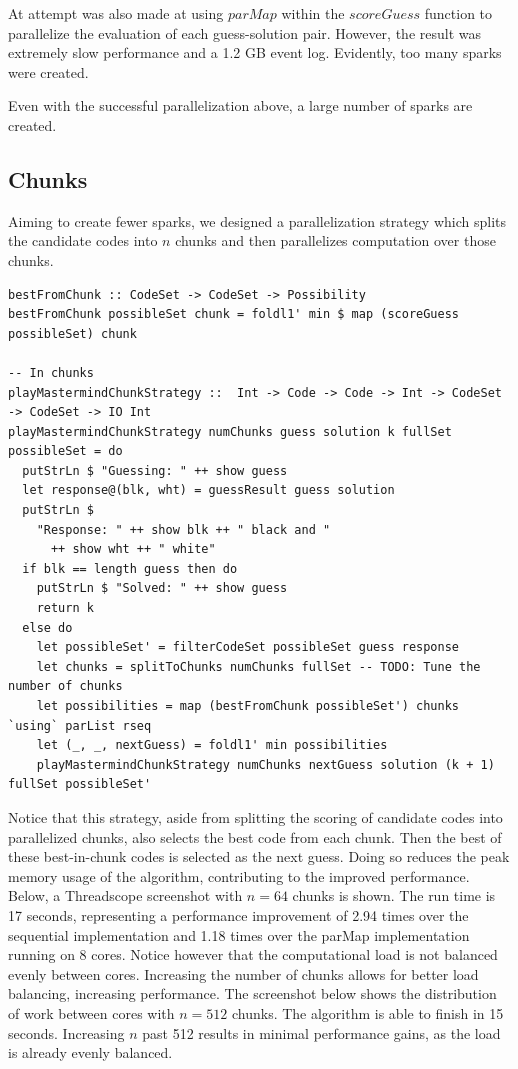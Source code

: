 \documentclass{article}
\begin{document}
At attempt was also made at using $parMap$ within the $scoreGuess$ function to parallelize the evaluation of each guess-solution pair. However, the result was extremely slow performance and a 1.2 GB event log. Evidently, too many sparks were created.

Even with the successful parallelization above, a large number of sparks are created.

\subsection{Chunks}
Aiming to create fewer sparks, we designed a parallelization strategy which splits the candidate codes into $n$ chunks and then parallelizes computation over those chunks.
\begin{verbatim}
bestFromChunk :: CodeSet -> CodeSet -> Possibility
bestFromChunk possibleSet chunk = foldl1' min $ map (scoreGuess possibleSet) chunk

-- In chunks
playMastermindChunkStrategy ::  Int -> Code -> Code -> Int -> CodeSet -> CodeSet -> IO Int
playMastermindChunkStrategy numChunks guess solution k fullSet possibleSet = do
  putStrLn $ "Guessing: " ++ show guess
  let response@(blk, wht) = guessResult guess solution
  putStrLn $
    "Response: " ++ show blk ++ " black and "
      ++ show wht ++ " white"
  if blk == length guess then do
    putStrLn $ "Solved: " ++ show guess
    return k
  else do
    let possibleSet' = filterCodeSet possibleSet guess response
    let chunks = splitToChunks numChunks fullSet -- TODO: Tune the number of chunks
    let possibilities = map (bestFromChunk possibleSet') chunks `using` parList rseq
    let (_, _, nextGuess) = foldl1' min possibilities
    playMastermindChunkStrategy numChunks nextGuess solution (k + 1) fullSet possibleSet'
\end{verbatim}

Notice that this strategy, aside from splitting the scoring of candidate codes into parallelized chunks, also selects the best code from each chunk. Then the best of these best-in-chunk codes is selected as the next guess. Doing so reduces the peak memory usage of the algorithm, contributing to the improved performance. Below, a Threadscope screenshot with $n=64$ chunks is shown. The run time is 17 seconds, representing a performance improvement of 2.94 times over the sequential implementation and 1.18 times over the parMap implementation running on 8 cores. Notice however that the computational load is not balanced evenly between cores.
Increasing the number of chunks allows for better load balancing, increasing performance. The screenshot below shows the distribution of work between cores with $n=512$ chunks. The algorithm is able to finish in 15 seconds.
Increasing $n$ past 512 results in minimal performance gains, as the load is already evenly balanced.
\end{document}
